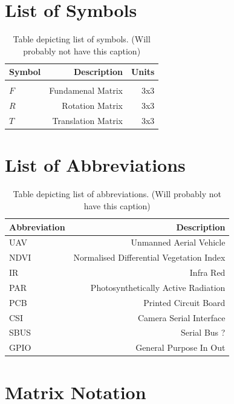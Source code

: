 \cleardoublepage
\tableofcontents

\clearpage
\label{listoffigures}
\listoffigures

\clearpage
{}
\label{listoftables}
\listoftables

\chapter{List of Symbols}
\begin{table}[H]
\centering
\begin{tabular}{l|r|r}
Symbol & Description & Units\\\hline\\
$F$ & Fundamenal Matrix & 3x3\\
$R$ & Rotation Matrix & 3x3\\
$T$ & Translation Matrix & 3x3\\
\end{tabular}
\caption{\label{tab:symb}Table depicting list of symbols. (Will probably not have this caption)}
\end{table}

\chapter{List of Abbreviations}
\begin{table}[H]
\centering
\begin{tabular}{l|r}
Abbreviation & Description \\\hline
UAV & Unmanned Aerial Vehicle \\
NDVI & Normalised Differential Vegetation Index\\
IR & Infra Red\\
PAR & Photosynthetically Active Radiation\\
PCB & Printed Circuit Board\\
CSI & Camera Serial Interface\\
SBUS & Serial Bus ?\\
GPIO & General Purpose In Out\\
\end{tabular}
\caption{\label{tab:abbr}Table depicting list of abbreviations. (Will probably not have this caption)}
\end{table}

\chapter{Matrix Notation}

